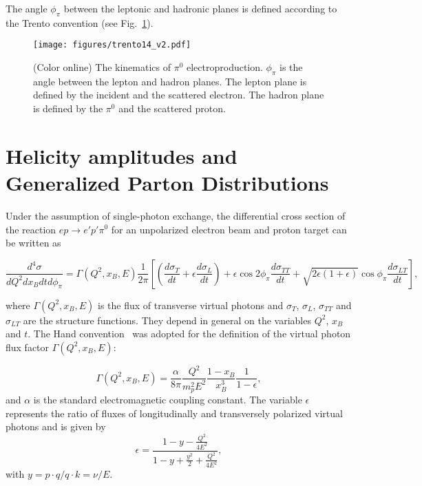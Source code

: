 \documentclass[prc,floatfix,twocolumn,superscriptaddress,letter]{revtex4}
\begin{document}
The angle  $\phi_\pi$ between the leptonic and hadronic planes is defined according to the Trento convention \cite{trento} (see Fig.~\ref{fig:phi_def}).

\begin{figure}
\vspace{0.20 in}
\texttt{[image: figures/trento14\_v2.pdf]}
\caption{\label{fig:phi_def} (Color online) The kinematics  of $\pi^0$ electroproduction. $\phi_{\pi}$ is the angle between the lepton and hadron planes. The lepton plane is defined by the incident and the scattered electron. The hadron plane  is defined by the $\pi^0$ and the scattered proton.}
\end{figure}

\section{Helicity amplitudes and Generalized Parton Distributions}
\label{section:helicity_amp}

Under the assumption of single-photon exchange, the differential cross section of the reaction $ep\to e'p'\pi^0$ for an unpolarized electron beam and proton target
can be written as    \cite{G-K-09}
\begin{widetext}
\begin{equation}
 \frac {d^4\sigma}    {dQ^2 dx_B dt d\phi_\pi}  =  \Gamma(Q^2,x_B,E)  \frac{1}{2\pi}
\left[\left( \frac{d\sigma_T}{dt}+\epsilon \frac{d\sigma_L}{dt}\right)
+ \epsilon \cos 2 \phi_\pi  \frac{d\sigma_{TT}}{dt} + \sqrt{2\epsilon(1+\epsilon)} \cos \phi_\pi  \frac{d\sigma_{LT}}{dt} 
\right],
\label{eq:d4sigma}
\end{equation}
\end{widetext}
\noindent 
where $\Gamma(Q^2,x_B,E)$ is the flux of transverse virtual photons
 and $\sigma_T$, $\sigma_L$, $\sigma_{TT}$ and $\sigma_{LT}$ are the structure functions. 
They depend in general on the variables $Q^2$, $x_B$ and $t$.
The Hand convention~\cite{Hand} was adopted for the definition of the virtual photon flux factor 
$\Gamma(Q^2,x_B,E)$:

\begin{equation}
\Gamma (Q^2,x_B,E)= \frac{\alpha}{8\pi} \frac{Q^2}{m_p^2 E^2} 
\frac{1-x_B}{x_B^3} \frac{1}{1-\epsilon},
\label{eq:GammaV}
\end{equation}
\noindent and $\alpha$ is the standard electromagnetic coupling constant.
The variable $\epsilon$ represents the ratio of fluxes of longitudinally  and transversely polarized virtual photons and is given by
\begin{equation}
\epsilon=\frac {1-y-\frac{Q^2}{4E^2}}   {1-y+\frac{y^2}{2}+\frac{Q^2}{4E^2} }
\label{epsilon},
\end{equation}
with $y=p \cdot q/q \cdot k=\nu/E$.
\end{document}
